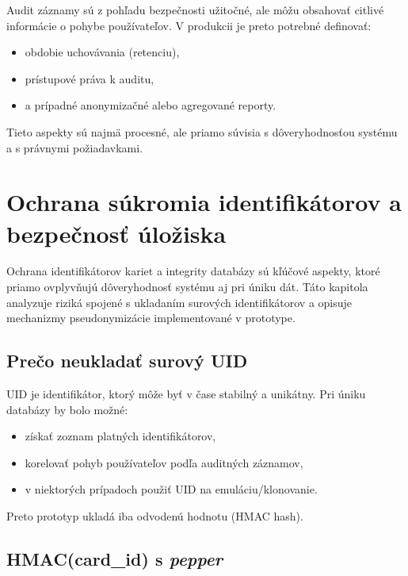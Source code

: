 \documentclass[journal,a4paper,onecolumn]{IEEEtran}
\begin{document}
Audit záznamy sú z pohľadu bezpečnosti užitočné, ale môžu obsahovať citlivé informácie o pohybe používateľov. V produkcii je preto potrebné definovať:

\begin{itemize}[leftmargin=*,itemsep=2pt]
  \item obdobie uchovávania (retenciu),
  \item prístupové práva k auditu,
  \item a prípadné anonymizačné alebo agregované reporty.
\end{itemize}

Tieto aspekty sú najmä procesné, ale priamo súvisia s dôveryhodnosťou systému a s právnymi požiadavkami.

\section{Ochrana súkromia identifikátorov a bezpečnosť úložiska}

Ochrana identifikátorov kariet a integrity databázy sú kľúčové aspekty, ktoré priamo ovplyvňujú dôveryhodnosť systému aj pri úniku dát. Táto kapitola analyzuje riziká spojené s ukladaním surových identifikátorov a opisuje mechanizmy pseudonymizácie implementované v prototype.

\subsection{Prečo neukladať surový UID}

UID je identifikátor, ktorý môže byť v čase stabilný a unikátny. Pri úniku databázy by bolo možné:

\begin{itemize}[leftmargin=*,itemsep=2pt]
  \item získať zoznam platných identifikátorov,
  \item korelovať pohyb používateľov podľa auditných záznamov,
  \item v niektorých prípadoch použiť UID na emuláciu/klonovanie.
\end{itemize}

Preto prototyp ukladá iba odvodenú hodnotu (HMAC hash).

\subsection{HMAC(card\_id) s \emph{pepper}}
\end{document}
